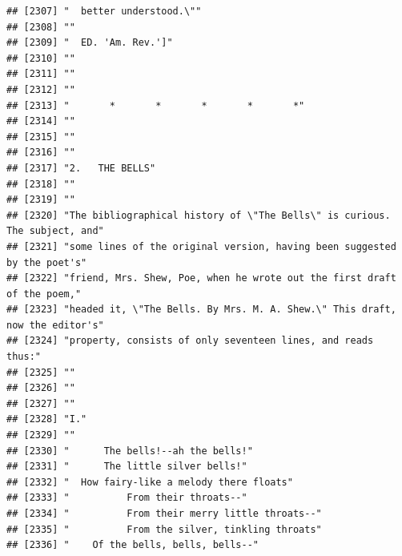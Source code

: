\documentclass{article}\usepackage[]{graphicx}\usepackage[]{color}
\makeatletter
\newenvironment{kframe}{%
 \def\at@end@of@kframe{}%
 \ifinner\ifhmode%
  \def\at@end@of@kframe{\end{minipage}}%
  \begin{minipage}{\columnwidth}%
 \fi\fi%
 \def\FrameCommand##1{\hskip\@totalleftmargin \hskip-\fboxsep
 \colorbox{shadecolor}{##1}\hskip-\fboxsep
     \hskip-\linewidth \hskip-\@totalleftmargin \hskip\columnwidth}%
 \MakeFramed {\advance\hsize-\width
   \@totalleftmargin\z@ \linewidth\hsize
   \@setminipage}}%
 {\par\unskip\endMakeFramed%
 \at@end@of@kframe}
\newenvironment{knitrout}{}{} %
\makeatother
\begin{document}
\begin{knitrout}
\begin{kframe}
\begin{verbatim}
## [2307] "  better understood.\""                                                      
## [2308] ""                                                                            
## [2309] "  ED. 'Am. Rev.']"                                                           
## [2310] ""                                                                            
## [2311] ""                                                                            
## [2312] ""                                                                            
## [2313] "       *       *       *       *       *"                                    
## [2314] ""                                                                            
## [2315] ""                                                                            
## [2316] ""                                                                            
## [2317] "2.   THE BELLS"                                                              
## [2318] ""                                                                            
## [2319] ""                                                                            
## [2320] "The bibliographical history of \"The Bells\" is curious. The subject, and"   
## [2321] "some lines of the original version, having been suggested by the poet's"     
## [2322] "friend, Mrs. Shew, Poe, when he wrote out the first draft of the poem,"      
## [2323] "headed it, \"The Bells. By Mrs. M. A. Shew.\" This draft, now the editor's"  
## [2324] "property, consists of only seventeen lines, and reads thus:"                 
## [2325] ""                                                                            
## [2326] ""                                                                            
## [2327] ""                                                                            
## [2328] "I."                                                                          
## [2329] ""                                                                            
## [2330] "      The bells!--ah the bells!"                                             
## [2331] "      The little silver bells!"                                              
## [2332] "  How fairy-like a melody there floats"                                      
## [2333] "          From their throats--"                                              
## [2334] "          From their merry little throats--"                                 
## [2335] "          From the silver, tinkling throats"                                 
## [2336] "    Of the bells, bells, bells--"                                            

\end{verbatim}
\end{kframe}
\end{knitrout}
\end{document}
